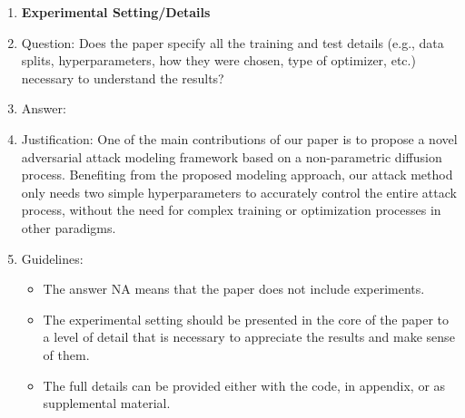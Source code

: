 \documentclass{article}
\begin{document}
\begin{enumerate}
\item {\bf Experimental Setting/Details}
    \item[] Question: Does the paper specify all the training and test details (e.g., data splits, hyperparameters, how they were chosen, type of optimizer, etc.) necessary to understand the results?
    \item[] Answer: \answerYes{} %
    \item[] Justification: One of the main contributions of our paper is to propose a novel adversarial attack modeling framework based on a non-parametric diffusion process. Benefiting from the proposed modeling approach, our attack method only needs two simple hyperparameters to accurately control the entire attack process, without the need for complex training or optimization processes in other paradigms.
    \item[] Guidelines:
    \begin{itemize}
        \item The answer NA means that the paper does not include experiments.
        \item The experimental setting should be presented in the core of the paper to a level of detail that is necessary to appreciate the results and make sense of them.
        \item The full details can be provided either with the code, in appendix, or as supplemental material.
    \end{itemize}


\end{enumerate}
\end{document}
